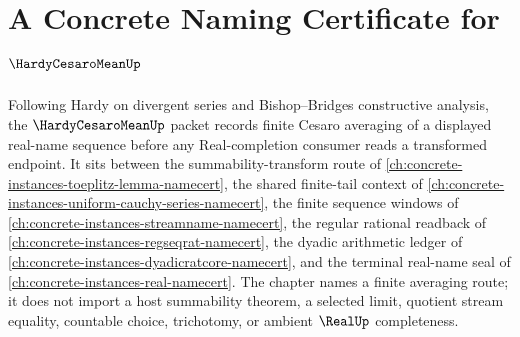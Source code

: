 \chapter{A Concrete Naming Certificate for $\HardyCesaroMeanUp$}
\label{ch:concrete-instances-hardy-cesaro-mean-namecert}

Following Hardy on divergent series and Bishop--Bridges constructive analysis, the $\HardyCesaroMeanUp$ packet records finite Cesaro averaging of a displayed real-name sequence before any Real-completion consumer reads a transformed endpoint. It sits between the summability-transform route of \autoref{ch:concrete-instances-toeplitz-lemma-namecert}, the shared finite-tail context of \autoref{ch:concrete-instances-uniform-cauchy-series-namecert}, the finite sequence windows of \autoref{ch:concrete-instances-streamname-namecert}, the regular rational readback of \autoref{ch:concrete-instances-regseqrat-namecert}, the dyadic arithmetic ledger of \autoref{ch:concrete-instances-dyadicratcore-namecert}, and the terminal real-name seal of \autoref{ch:concrete-instances-real-namecert}. The chapter names a finite averaging route; it does not import a host summability theorem, a selected limit, quotient stream equality, countable choice, trichotomy, or ambient $\RealUp$ completeness.

